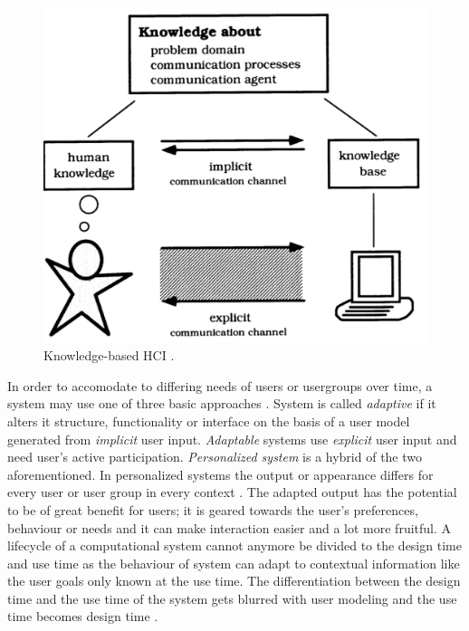 \documentclass{sigchi}
\begin{document}
\begin{figure}[htp] %
\caption{Knowledge-based HCI \protect\cite{fischer01}.}   \label{know_hci}
\includegraphics[scale=0.45]{figures/knowledge_hci.pdf} 
\end{figure}

In order to accomodate to differing needs of users or usergroups over time, a system may use one of three basic approaches \cite{van08}. System is called \textit{adaptive} if it alters it structure, functionality or interface on the basis of a user model generated from \textit{implicit} user input. \textit{Adaptable} systems use \textit{explicit} user input and need user's active participation. \textit{Personalized system} is a hybrid of the two aforementioned. In personalized systems the output or appearance differs for every user or user group in every context \cite{van08}. The adapted output has the potential to be of great benefit for users; it is geared towards the user's preferences, behaviour or needs and it can make interaction easier and a lot more fruitful. A lifecycle of a computational system cannot anymore be divided to the design time and use time as the behaviour of system can adapt to contextual information like the user goals only known at the use time. The differentiation between the design time and the use time of the system gets blurred with user modeling and the use time becomes design time \cite{fischer01}.
\end{document}
